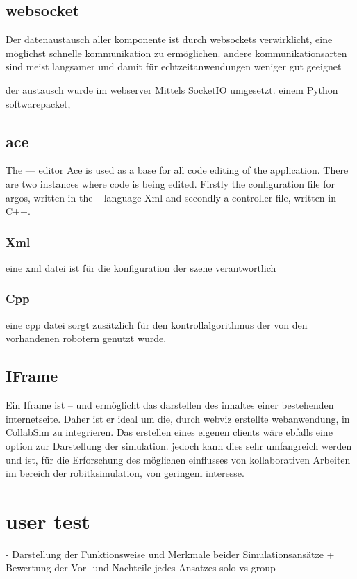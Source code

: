 \documentclass[german,version-2020-11]{uzl-thesis}
\begin{document}
\section{websocket}
Der datenaustausch aller komponente ist durch websockets verwirklicht, eine möglichst schnelle kommunikation zu ermöglichen. 
andere kommunikationsarten sind meist langsamer und damit für echtzeitanwendungen weniger gut geeignet

der austausch wurde im webserver Mittels SocketIO umgesetzt. einem Python softwarepacket,
\section{ace}
The --- editor Ace is used as a base for all code editing of the application.
There are two instances where code is being edited. Firstly the configuration file for argos, written in the -- language Xml and secondly a controller file, written in C++.   

\subsection{Xml} 
     eine xml datei ist für die konfiguration der szene verantwortlich
\subsection{Cpp}
      eine cpp datei sorgt zusätzlich für den kontrollalgorithmus der von den vorhandenen robotern genutzt wurde.


\section{IFrame}
Ein Iframe ist -- und ermöglicht das darstellen des inhaltes einer bestehenden internetseite. 
Daher ist er ideal um die, durch webviz erstellte webanwendung, in CollabSim zu integrieren.
Das erstellen eines eigenen clients wäre ebfalls eine option zur Darstellung der simulation. 
jedoch kann dies sehr umfangreich werden und ist, für die Erforschung des möglichen einflusses von 
kollaborativen Arbeiten im bereich der robitksimulation, von geringem interesse.







\chapter{user test} 
- Darstellung der Funktionsweise und Merkmale beider Simulationsansätze + Bewertung der Vor- und Nachteile jedes Ansatzes
solo vs group
\end{document}
